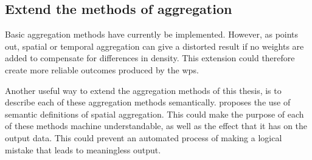 \subsection{Extend the methods of aggregation}
\label{par:FRaggregation}

Basic aggregation methods have currently be implemented. However, as \cite{SW:Ganesan} points out, spatial or temporal aggregation can give a distorted result if no weights are added to compensate for differences in density. This extension could therefore create more reliable outcomes produced by the \ac{wps}. 

Another useful way to extend the aggregation methods of this thesis, is to describe each of these aggregation methods semantically. \cite{SSW:Stasch4} proposes the use of semantic definitions of spatial aggregation. This could make the purpose of each of these methods machine understandable, as well as the effect that it has on the output data. This could prevent an automated process of making a logical mistake that leads to meaningless output.

